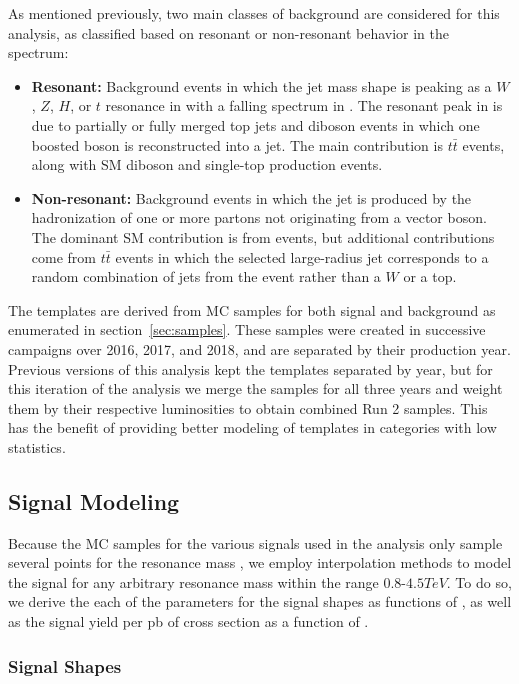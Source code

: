 As mentioned previously, two main classes of background are considered for this analysis, as classified based on resonant or non-resonant behavior in the \MJ spectrum:
\begin{itemize}
  \item \textbf{Resonant:} Background events in which the jet mass shape is peaking as a $W$, $Z$, $H$, or $t$ resonance in \MJ with a falling spectrum in \MVV.
  The resonant peak in \MJ is due to partially or fully merged top jets and diboson events in which one boosted boson is reconstructed into a jet.
  The main contribution is $t\bar{t}$ events, along with SM diboson and single-top production events.
  \item \textbf{Non-resonant:} Background events in which the jet is produced by the hadronization of one or more partons not originating from a vector boson.
  The dominant SM contribution is from \Wjets events, but additional contributions come from $t\bar{t}$ events in which the selected large-radius jet corresponds to a random combination of jets from the event rather than a $W$ or a top.
\end{itemize}

The templates are derived from MC samples for both signal and background as enumerated in section~\ref{sec:samples}.
These samples were created in successive campaigns over 2016, 2017, and 2018, and are separated by their production year.
Previous versions of this analysis kept the templates separated by year, but for this iteration of the analysis we merge the samples for all three years and weight them by their respective luminosities to obtain combined Run 2 samples.
This has the benefit of providing better modeling of templates in categories with low statistics.

\subsection{Signal Modeling}
\label{sec:sig}

Because the MC samples for the various signals used in the analysis only sample several points for the resonance mass \MX, we employ interpolation methods to model the signal for any arbitrary resonance mass \MX within the range 0.8-$4.5\unit{TeV}$.
To do so, we derive the each of the parameters for the signal shapes as functions of \MX, as well as the signal yield per pb of cross section as a function of \MX.

\subsubsection{Signal Shapes}

